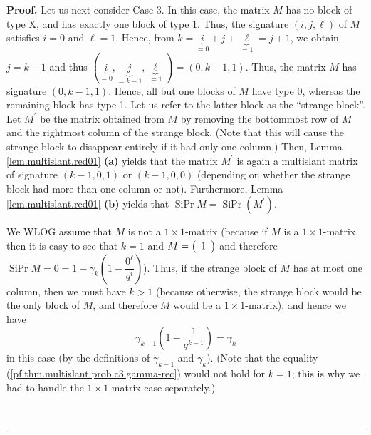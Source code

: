 \documentclass[numbers=enddot,12pt,final,onecolumn,notitlepage]{scrartcl}%
\theoremstyle{definition}
\newenvironment{proof}[1][Proof]{\noindent\textbf{#1.} }{\ \rule{0.5em}{0.5em}}
\theoremstyle{plainsl}
\begin{document}
\begin{proof}
Let us next consider Case 3. In this case, the matrix $M$ has no block of type
X, and has exactly one block of type 1. Thus, the signature $\left(
i,j,\ell\right)  $ of $M$ satisfies $i=0$ and $\ell=1$. Hence, from
$k=\underbrace{i}_{=0}+j+\underbrace{\ell}_{=1}=j+1$, we obtain $j=k-1$ and
thus $\left(  \underbrace{i}_{=0},\underbrace{j}_{=k-1},\underbrace{\ell}%
_{=1}\right)  =\left(  0,k-1,1\right)  $. Thus, the matrix $M$ has signature
$\left(  0,k-1,1\right)  $. Hence, all but one blocks of $M$ have type 0,
whereas the remaining block has type 1. Let us refer to the latter block as
the ``strange block''. Let $M^{\prime}$ be the
matrix obtained from $M$ by removing the bottommost row of $M$ and the
rightmost column of the strange block. (Note that this will cause the strange
block to disappear entirely if it had only one column.) Then, Lemma
\ref{lem.multislant.red01} \textbf{(a)} yields that the matrix $M^{\prime}$ is
again a multislant matrix of signature $\left(  k-1,0,1\right)  $ or $\left(
k-1,0,0\right)  $ (depending on whether the strange block had more than one
column or not). Furthermore, Lemma \ref{lem.multislant.red01} \textbf{(b)}
yields that $\operatorname*{SiPr}M=\operatorname*{SiPr}\left(  M^{\prime
}\right)  $.

We WLOG assume that $M$ is not a $1\times1$-matrix (because if $M$ is a
$1\times1$-matrix, then it is easy to see that $k=1$ and $M=\left(
\begin{array}
[c]{c}%
1
\end{array}
\right)  $ and therefore $\operatorname*{SiPr}M=0=1-\gamma_{k}\left(
1-\dfrac{0^{\ell}}{q^{i}}\right)  $). Thus, if the strange block of $M$ has at
most one column, then we must have $k>1$ (because otherwise, the strange block
would be the only block of $M$, and therefore $M$ would be a $1\times
1$-matrix), and hence we have
\begin{equation}
\gamma_{k-1}\left(  1-\dfrac{1}{q^{k-1}}\right)  =\gamma_{k}
\label{pf.thm.multislant.prob.c3.gamma-rec}%
\end{equation}
in this case (by the definitions of $\gamma_{k-1}$ and $\gamma_{k}$). (Note
that the equality (\ref{pf.thm.multislant.prob.c3.gamma-rec}) would not hold
for $k=1$; this is why we had to handle the $1\times1$-matrix case separately.)


\end{proof}
\end{document}
